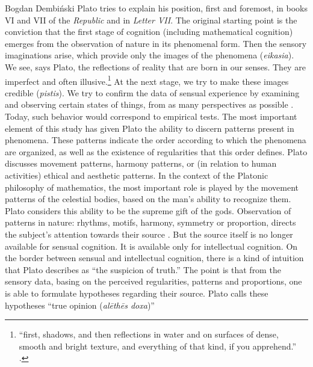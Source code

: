 \begin{artengenv}{Bogdan Dembiński}
Plato tries to explain his position, first and foremost, in books VI and VII of the \textit{Republic} and in
\textit{Letter VII}. The original starting point is the conviction that the first stage of cognition (including
mathematical cognition) emerges from the observation of nature in its phenomenal form. Then the sensory imaginations
arise, which provide only the images of the phenomena (\textit{eikasia}). We see, says Plato, the reflections of
reality that are born in our senses. They are imperfect and often illusive.\footnote{``first, shadows, and then
reflections in water and on surfaces of dense, smooth and bright texture, and everything of that kind, if you
apprehend.''
\parencite[Republic, 510a]{plato_platonis_1955}.
} At the next stage, we try to make these images
credible (\textit{pistis}). We try to confirm the data of sensual experience by examining and observing certain states
of things, from as many perspectives as possible
\parencite[Republic, 509d-511e]{plato_platonis_1955}.
Today,
such behavior would correspond to empirical tests. The most important element of this study %
has given Plato the ability to discern patterns present in phenomena. These patterns indicate the order according to
which the phenomena are\textbf{ }organized, as well as the existence of regularities that this order defines. Plato
discusses movement patterns, harmony patterns, or (in relation to human activities) ethical and aesthetic patterns. In
the context of the Platonic philosophy of mathematics, the most important role is played by the movement patterns of
the celestial bodies, based on the man’s ability to recognize them. Plato considers this ability to be the supreme gift
of the gods. Observation of patterns in nature: rhythms, motifs, harmony, symmetry or proportion, directs the subject’s
attention towards their source
\parencite[Timaeus, 47a-e]{plato_platonis_1955}.
But the source itself is no
longer available for sensual cognition. It is available only for intellectual cognition. On the border between sensual
and intellectual cognition, there is a kind of intuition that Plato describes as ``the suspicion of truth.'' The point is
that from the sensory data, basing on the perceived regularities, patterns and proportions, one is able to formulate
hypotheses regarding their source. Plato calls these hypotheses ``true opinion (\textit{al\=eth\=es doxa})''

\end{artengenv}
